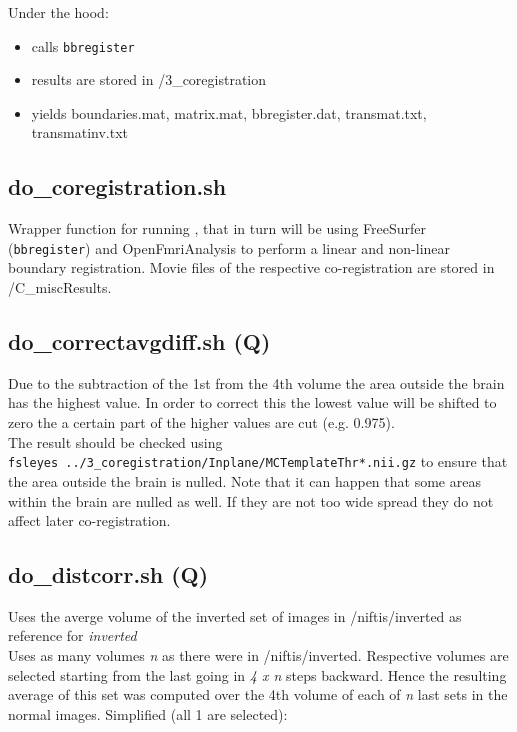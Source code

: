\documentclass[12pt,a4paper]{scrartcl}
\begin{document}
\noindent Under the hood:
\begin{itemize}
\item calls \texttt{bbregister}
\item results are stored in /3\_coregistration
\item yields boundaries.mat, matrix.mat, bbregister.dat, transmat.txt, transmatinv.txt
\end{itemize}

\subsection{do\_coregistration.sh}
\label{sh:coreg}
Wrapper function for running \texttt{}, that in turn will be using FreeSurfer (\texttt{bbregister}) and OpenFmriAnalysis to perform a linear and non-linear boundary registration.  Movie files of the respective co-registration are stored in /C\_miscResults.\\

\subsection{do\_correctavgdiff.sh (Q)}
\label{sh:corravg}
Due to the subtraction of the 1st from the 4th volume the area outside the brain has the highest value. In order to correct this the lowest value will be shifted to zero the a certain part of the higher values are cut (e.g. 0.975).\\

\noindent The result should be checked using\\
\texttt{fsleyes ../3\_coregistration/Inplane/MCTemplateThr*.nii.gz} to ensure that the area outside the brain is nulled. Note that it can happen that some areas within the brain are nulled as well. If they are not too wide spread they do not affect later co-registration.\\

\subsection{do\_distcorr.sh (Q)}
\label{sh:distcorr}
Uses the averge volume of the inverted set of images in /niftis/inverted as reference for \textit{inverted}\\

\noindent Uses as many volumes \textit{n} as there were in /niftis/inverted. Respective volumes are selected starting from the last going in \textit{4 x n} steps backward. Hence the resulting average of this set was computed over the 4th volume of each of \textit{n} last sets in the normal images. Simplified (all 1 are selected):\\
\end{document}
